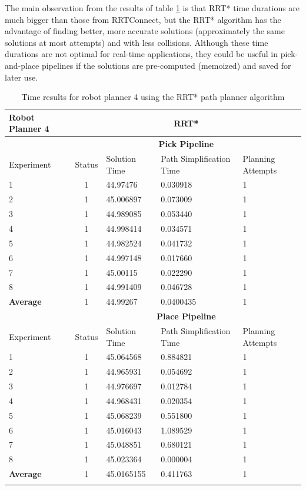 The main observation from the results of table \ref{robot-planner4-rrtstar-data} is that RRT* time durations are much bigger than those from RRTConnect, but the RRT* algorithm has the advantage of finding better, more accurate solutions (approximately the same solutions at most attempts) and with less collisions. Although these time durations are not optimal for real-time applications, they could be useful in pick-and-place pipelines 
if the solutions are pre-computed (memoized) and saved for later use.

\begin{longtable}{|p{2cm}|c|p{3cm}|p{3cm}|p{3cm}|}
\hline
Robot Planner 4           & \multicolumn{4}{c}{\textbf{RRT*}}                                                                                                 \vline \\
\hline
                          & \multicolumn{4}{c}{\textbf{Pick Pipeline}}                     \vline \\
\hline
Experiment                & Status & Solution Time & Path Simplification Time & Planning Attempts  \\
\hline
1	& 1 & 44.97476	& 0.030918	& 1	\\
2	& 1 & 45.006897	& 0.073009	& 1	\\
3	& 1	& 44.989085	& 0.053440	& 1	\\
4	& 1 & 44.998414	& 0.034571	& 1	\\
5	& 1 & 44.982524	& 0.041732	& 1	\\
6	& 1 & 44.997148	& 0.017660	& 1	\\
7	& 1 & 45.00115	& 0.022290	& 1	\\
8	& 1 & 44.991409	& 0.046728	& 1	\\
\hline
\textbf{Average} & 1 & 44.99267	& 0.0400435	& 1	\\
\hline
                          & \multicolumn{4}{c}{\textbf{Place Pipeline}}                     \vline \\
\hline
Experiment                & Status & Solution Time & Path Simplification Time & Planning Attempts  \\
\hline
1	& 1	& 45.064568	& 0.884821	& 1 \\
2	& 1	& 44.965931	& 0.054692	& 1 \\
3	& 1	& 44.976697	& 0.012784	& 1 \\
4	& 1	& 44.968431	& 0.020354	& 1 \\
5	& 1	& 45.068239	& 0.551800	& 1 \\
6	& 1	& 45.016043	& 1.089529	& 1 \\
7	& 1	& 45.048851	& 0.680121	& 1 \\
8	& 1	& 45.023364	& 0.000004	& 1 \\
\hline
\textbf{Average} & 1	& 45.0165155	& 0.411763	& 1 \\
\hline
\caption{Time results for robot planner 4 using the RRT* path planner algorithm}
\label{robot-planner4-rrtstar-data}
\end{longtable}

